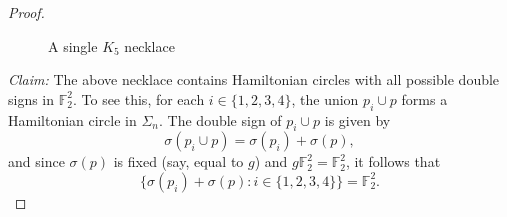 \documentclass[12pt]{amsart}
\theoremstyle{plain}
\theoremstyle{definition}%
\begin{document}
\begin{proof}
\begin{figure}[H]


 \caption{A single \(K_5\) necklace}
    \label{K5}
\end{figure}


\emph{Claim:} The above necklace contains Hamiltonian circles with all possible double signs in \(\mathbb{F}_2^2\). To see this, for each \(i \in \{1,2,3,4\}\), the union \(p_i \cup p\) forms a Hamiltonian circle in \(\Sigma_n\). The double sign of \(p_i \cup p\) is given by
\[
\sigma(p_i \cup p) = \sigma(p_i) + \sigma(p),
\]
and since \(\sigma(p)\) is fixed (say, equal to \(g\)) and \(g \mathbb{F}_2^2 = \mathbb{F}_2^2\), it follows that
\[
\{\sigma(p_i)+ \sigma(p) : i\in\{1,2,3,4\}\} = \mathbb{F}_2^2.
\]


\medskip


\end{proof}
\end{document}
